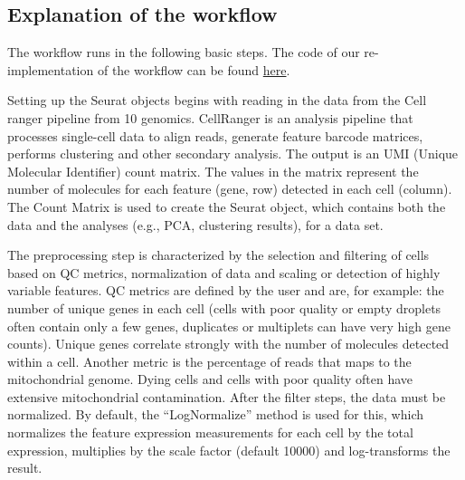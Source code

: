 \documentclass[a4paper, 10pt]{scrartcl}
\begin{document}
\hypertarget{explanation-of-the-workflow}{%
\subsection{Explanation of the
workflow}\label{explanation-of-the-workflow}}

The workflow runs in the following basic steps. The code of our
re-implementation of the workflow can be found
\href{https://github.com/gschloegel/Course_Fallstudie_scRNA-Seq-with-Seurat/blob/main/scripts/replicated_tutorial_pbmc3k.md}{here}.

\hypertarget{setting-up-the-seurat-object}{%
\label{setting-up-the-seurat-object}}

Setting up the Seurat objects begins with reading in the data from the
Cell ranger pipeline from 10 genomics. CellRanger is an analysis
pipeline that processes single-cell data to align reads, generate
feature barcode matrices, performs clustering and other secondary
analysis. The output is an UMI (Unique Molecular Identifier) count
matrix. The values in the matrix represent the number of molecules for
each feature (gene, row) detected in each cell (column). The Count
Matrix is used to create the Seurat object, which contains both the data
and the analyses (e.g., PCA, clustering results), for a data set.

\hypertarget{pre-processing}{%
\label{pre-processing}}

The preprocessing step is characterized by the selection and filtering
of cells based on QC metrics, normalization of data and scaling or
detection of highly variable features. QC metrics are defined by the
user and are, for example: the number of unique genes in each cell
(cells with poor quality or empty droplets often contain only a few
genes, duplicates or multiplets can have very high gene counts). Unique
genes correlate strongly with the number of molecules detected within a
cell. Another metric is the percentage of reads that maps to the
mitochondrial genome. Dying cells and cells with poor quality often have
extensive mitochondrial contamination. After the filter steps, the data
must be normalized. By default, the ``LogNormalize'' method is used for
this, which normalizes the feature expression measurements for each cell
by the total expression, multiplies by the scale factor (default 10000)
and log-transforms the result.

\hypertarget{identification-of-highly-variable-features-and-pca}{%
\label{identification-of-highly-variable-features-and-pca}}
\end{document}
